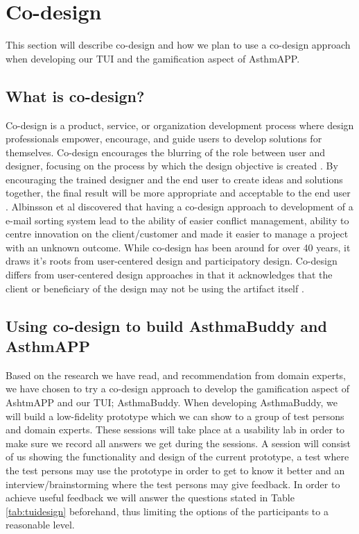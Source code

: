 \section{Co-design}
\label{sec:codesign}
This section will describe co-design and how we plan to use a co-design approach when developing our TUI and the gamification aspect of AsthmAPP.

\subsection{What is co-design?}
Co-design is a product, service, or organization development process where design professionals empower, encourage, and guide users to develop solutions for themselves. Co-design encourages the blurring of the role between user and designer, focusing on the process by which the design objective is created \cite{sanders2008co}. By encouraging the trained designer and the end user to create ideas and solutions together, the final result will be more appropriate and acceptable to the end user \cite{albinsson2007co}. 
Albinsson et al \cite{albinsson2007co} discovered that having a co-design approach to development of a e-mail sorting system lead to the ability of easier conflict management, ability to centre innovation on the client/customer and made it easier to manage a project with an unknown outcome. While co-design has been around for over 40 years, it draws it's roots from user-centered design and participatory design. Co-design differs from user-centered design approaches in that it acknowledges that the client or beneficiary of the design may not be using the artifact itself \cite{norman1986user}.



\subsection{Using co-design to build AsthmaBuddy and AsthmAPP}
Based on the research we have read, and recommendation from domain experts, we have chosen to try a co-design approach to develop the gamification aspect of AshtmAPP and our TUI; AsthmaBuddy. 
When developing AsthmaBuddy, we will build a low-fidelity prototype which we can show to a group of test persons and domain experts. These sessions will take place at a usability lab in order to make sure we record all answers we get during the sessions. A session will consist of us showing the functionality and design of the current prototype, a test where the test persons may use the prototype in order to get to know it better and an interview/brainstorming where the test persons may give feedback. In order to achieve useful feedback we will answer the questions stated in Table \ref{tab:tuidesign} beforehand, thus limiting the options of the participants to a reasonable level. 

